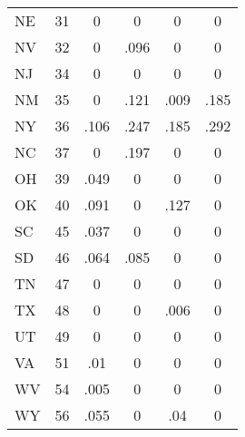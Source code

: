\begin{table}[htbp]
\begin{tabular}{l*{5}{c}}
NE          &          31&           0&           0&           0&           0\\
NV          &          32&           0&        .096&           0&           0\\
NJ          &          34&           0&           0&           0&           0\\
NM          &          35&           0&        .121&        .009&        .185\\
NY          &          36&        .106&        .247&        .185&        .292\\
NC          &          37&           0&        .197&           0&           0\\
OH          &          39&        .049&           0&           0&           0\\
OK          &          40&        .091&           0&        .127&           0\\
SC          &          45&        .037&           0&           0&           0\\
SD          &          46&        .064&        .085&           0&           0\\
TN          &          47&           0&           0&           0&           0\\
TX          &          48&           0&           0&        .006&           0\\
UT          &          49&           0&           0&           0&           0\\
VA          &          51&         .01&           0&           0&           0\\
WV          &          54&        .005&           0&           0&           0\\
WY          &          56&        .055&           0&         .04&           0\\
\bottomrule
\end{tabular}
\end{table}
